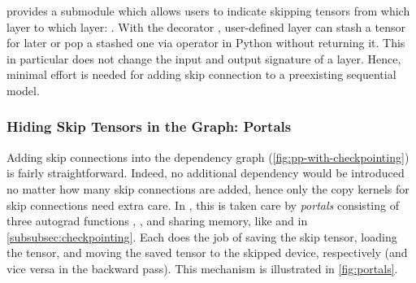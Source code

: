 {\torchgpipe} provides a submodule which allows users to indicate skipping tensors from which layer to which layer: . With the decorator , user-defined layer can stash a tensor for later or pop a stashed one via  operator in Python without returning it. This in particular does not change the input and output signature of a layer. Hence, minimal effort is needed for adding skip connection to a preexisting sequential model. 

\subsubsection{Hiding Skip Tensors in the Graph: Portals}
\label{subsubsec:portals}

Adding skip connections into the dependency graph (\autoref{fig:pp-with-checkpointing}) is fairly straightforward. Indeed, no additional dependency would be introduced no matter how many skip connections are added, hence only the copy kernels for skip connections need extra care. In {\torchgpipe}, this is taken care by \emph{portals} consisting of three autograd functions , , and  sharing memory, like  and  in \autoref{subsubsec:checkpointing}. Each does the job of saving the skip tensor, loading the tensor, and moving the saved tensor to the skipped device, respectively (and vice versa in the backward pass). This mechanism is illustrated in \autoref{fig:portals}.